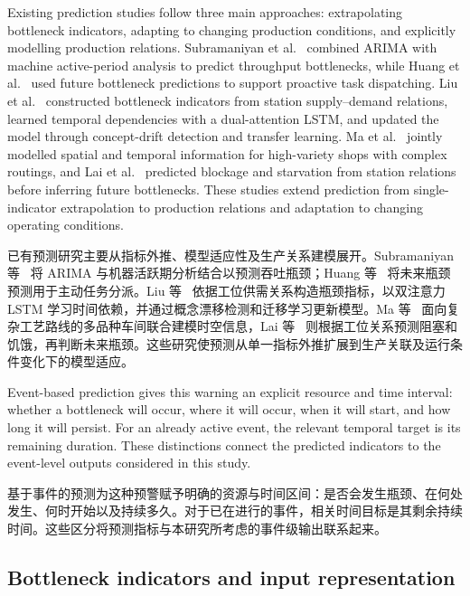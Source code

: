 \documentclass[a4paper,fleqn]{cas-dc}
\newcommand{\zhpara}[1]{%
  \par\begingroup\small\color{black!72}\noindent #1\par\endgroup}
\begin{document}
Existing prediction studies follow three main approaches: extrapolating bottleneck indicators, adapting to changing production conditions, and explicitly modelling production relations. Subramaniyan et al.~\cite{subramaniyan2018data} combined ARIMA with machine active-period analysis to predict throughput bottlenecks, while Huang et al.~\cite{huang2019proactive} used future bottleneck predictions to support proactive task dispatching. Liu et al.~\cite{liu2023lstmdam} constructed bottleneck indicators from station supply--demand relations, learned temporal dependencies with a dual-attention LSTM, and updated the model through concept-drift detection and transfer learning. Ma et al.~\cite{ma2023tusb} jointly modelled spatial and temporal information for high-variety shops with complex routings, and Lai et al.~\cite{lai2023bstan} predicted blockage and starvation from station relations before inferring future bottlenecks. These studies extend prediction from single-indicator extrapolation to production relations and adaptation to changing operating conditions.

\zhpara{已有预测研究主要从指标外推、模型适应性及生产关系建模展开。Subramaniyan 等~\cite{subramaniyan2018data} 将 ARIMA 与机器活跃期分析结合以预测吞吐瓶颈；Huang 等~\cite{huang2019proactive} 将未来瓶颈预测用于主动任务分派。Liu 等~\cite{liu2023lstmdam} 依据工位供需关系构造瓶颈指标，以双注意力 LSTM 学习时间依赖，并通过概念漂移检测和迁移学习更新模型。Ma 等~\cite{ma2023tusb} 面向复杂工艺路线的多品种车间联合建模时空信息，Lai 等~\cite{lai2023bstan} 则根据工位关系预测阻塞和饥饿，再判断未来瓶颈。这些研究使预测从单一指标外推扩展到生产关联及运行条件变化下的模型适应。}


Event-based prediction gives this warning an explicit resource and time interval: whether a bottleneck will occur, where it will occur, when it will start, and how long it will persist. For an already active event, the relevant temporal target is its remaining duration. These distinctions connect the predicted indicators to the event-level outputs considered in this study.

\zhpara{基于事件的预测为这种预警赋予明确的资源与时间区间：是否会发生瓶颈、在何处发生、何时开始以及持续多久。对于已在进行的事件，相关时间目标是其剩余持续时间。这些区分将预测指标与本研究所考虑的事件级输出联系起来。}


\subsection{Bottleneck indicators and input representation}
\end{document}
